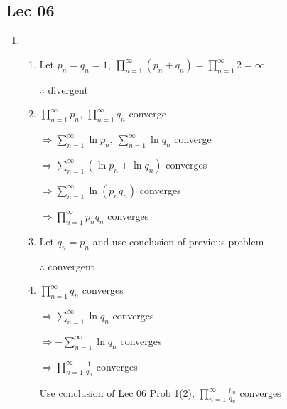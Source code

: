 \subsection{Lec 06}
    \begin{enumerate}[1]
        \item
            \begin{enumerate}[(1)]
                \item
                Let $p_n=q_n=1,\ \prod\limits_{n=1}^\infty (p_n+q_n)=\prod\limits_{n=1}^\infty 2 =\infty$
                \par $\therefore$ divergent

                \item
                $\prod\limits_{n=1}^\infty p_n,\ \prod\limits_{n=1}^\infty q_n$ converge
                \par $\Rightarrow \sum\limits_{n=1}^\infty \ln p_n,\ \sum\limits_{n=1}^\infty \ln q_n$ converge
                \par $\Rightarrow \sum\limits_{n=1}^\infty (\ln p_n+\ln q_n)$ converges
                \par $\Rightarrow \sum\limits_{n=1}^\infty \ln (p_nq_n)$ converges
                \par $\Rightarrow \prod\limits_{n=1}^\infty p_nq_n$ converges

                \item
                Let $q_n=p_n$ and use conclusion of previous problem
                \par $\therefore$ convergent

                \item
                $\prod\limits_{n=1}^\infty q_n$ converges
                \par $\Rightarrow \sum\limits_{n=1}^\infty \ln q_n$ converges
                \par $\Rightarrow -\sum\limits_{n=1}^\infty \ln q_n$ converges
                \par $\Rightarrow \prod\limits_{n=1}^\infty \frac{1}{q_n}$ converges
                \par Use conclusion of Lec 06 Prob 1(2), $\prod\limits_{n=1}^\infty \frac{p_n}{q_n}$ converges
            \end{enumerate}


\end{enumerate}
